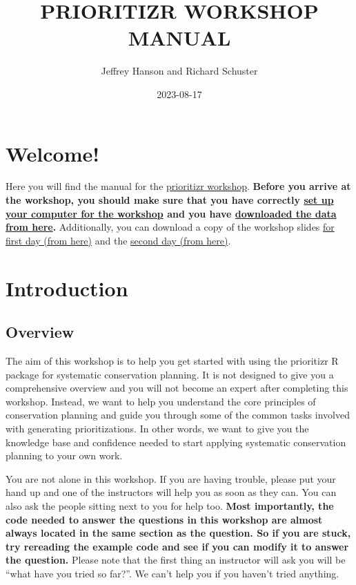 \documentclass[
  12pt,
]{book}
\title{PRIORITIZR WORKSHOP MANUAL}
\author{Jeffrey Hanson and Richard Schuster}
\date{2023-08-17}
\begin{document}
\maketitle

{
\hypersetup{linkcolor=}
\setcounter{tocdepth}{0}
\tableofcontents
}
\hypertarget{welcome}{%
\chapter{Welcome!}\label{welcome}}

Here you will find the manual for the \href{https://prioritizr.github.io/workshop/}{prioritizr workshop}. \textbf{Before you arrive at the workshop, you should make sure that you have correctly \protect\hyperlink{setup}{set up your computer for the workshop} and you have \href{https://github.com/prioritizr/workshop/raw/main/data.zip}{downloaded the data from here}.} Additionally, you can download a copy of the workshop slides \href{https://github.com/prioritizr/workshop/raw/main/slides-day-1.pptx}{for first day (from here)} and the \href{https://github.com/prioritizr/workshop/raw/main/slides-day-2.pptx}{second day (from here)}.

\hypertarget{introduction}{%
\chapter{Introduction}\label{introduction}}

\hypertarget{overview}{%
\section{Overview}\label{overview}}

The aim of this workshop is to help you get started with using the prioritizr R package for systematic conservation planning. It is not designed to give you a comprehensive overview and you will not become an expert after completing this workshop. Instead, we want to help you understand the core principles of conservation planning and guide you through some of the common tasks involved with generating prioritizations. In other words, we want to give you the knowledge base and confidence needed to start applying systematic conservation planning to your own work.

You are not alone in this workshop. If you are having trouble, please put your hand up and one of the instructors will help you as soon as they can. You can also ask the people sitting next to you for help too. \textbf{Most importantly, the code needed to answer the questions in this workshop are almost always located in the same section as the question. So if you are stuck, try rereading the example code and see if you can modify it to answer the question.} Please note that the first thing an instructor will ask you will be ``what have you tried so far?''. We can't help you if you haven't tried anything.
\end{document}
